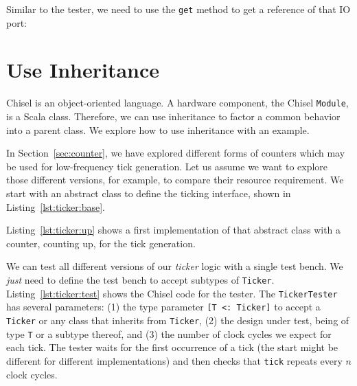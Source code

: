 \documentclass[%
    10pt,
    headinclude, footinclude=false,
    openright, %
    notitlepage,
    cleardoublepage=empty,
    headsepline,
    numbers=noenddot,
    bibliography=totoc, index=totoc,
    ]{scrbook}
\newcommand{\code}[1]{{\lstinline[basicstyle=\small\ttfamily]{#1}}}
\begin{document}

Similar to the tester, we need to  use the \code{get} method to get a reference
of that IO port:



\section{Use Inheritance}
\label{sec:inheritance}


Chisel is an object-oriented language. A hardware component, the Chisel \code{Module},
is a Scala class. Therefore, we can use inheritance to factor a common behavior
into a parent class. We explore how to use inheritance with an example.

In Section~\ref{sec:counter}, we have explored different forms of counters
which may be used for low-frequency tick generation. Let us assume we want to
explore those different versions, for example, to compare their resource requirement.
We start with an abstract class to define the ticking interface, shown in Listing~\ref{lst:ticker:base}.


\noindent Listing~\ref{lst:ticker:up} shows a first implementation of that abstract class
with a counter, counting up, for the tick generation.


We can test all different versions of our \emph{ticker} logic with a single test bench.
We \emph{just} need to define the test bench to accept subtypes of \code{Ticker}.
Listing~\ref{lst:ticker:test} shows the Chisel code for the tester.
The \code{TickerTester} has several parameters: (1) the type parameter
\code{[T <: Ticker]} to accept a \code{Ticker} or any class that inherits from \code{Ticker},
(2) the design under test, being of type \code{T} or a subtype thereof,
and (3) the number of clock cycles we expect for each tick.
The tester waits for the first occurrence of a tick (the start might be different for
different implementations) and then checks that \code{tick} repeats every $n$ clock cycles.

\end{document}
